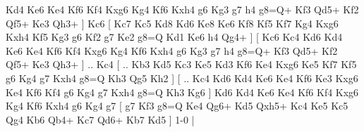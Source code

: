 Kd4  Ke6 Ke4  Kf6 Kf4  Kxg6 Kg4  Kf6 Kxh4  g6 Kg3  g7 h4  g8=Q+ Kf3  Qd5+ Kf2  Qf5+ Ke3  Qh3+   ]  Kc6 [  Kc7 Kc5  Kd8 Kd6  Ke8 Ke6  Kf8 Kf5  Kf7 Kg4  Kxg6 Kxh4  Kf5 Kg3  g6 Kf2  g7 Ke2  g8=Q Kd1  Ke6 h4  Qg4+   ]  [  Kc6 Kc4  Kd6 Kd4  Ke6 Ke4  Kf6 Kf4  Kxg6 Kg4  Kf6 Kxh4  g6 Kg3  g7 h4  g8=Q+ Kf3  Qd5+ Kf2  Qf5+ Ke3  Qh3+   ] .. Kc4 [ .. Kb3  Kd5 Kc3  Ke5 Kd3  Kf6 Ke4  Kxg6 Ke5  Kf7 Kf5  g6 Kg4  g7 Kxh4  g8=Q Kh3  Qg5 Kh2   ]  [ .. Kc4  Kd6 Kd4  Ke6 Ke4  Kf6 Ke3  Kxg6 Ke4  Kf6 Kf4  g6 Kg4  g7 Kxh4  g8=Q Kh3  Kg6   ]  Kd6   Kd4    Ke6   Ke4    Kf6   Kf4    Kxg6   Kg4    Kf6   Kxh4    g6   Kg4    g7    [  g7 Kf3  g8=Q Ke4  Qg6+ Kd5  Qxh5+ Kc4  Ke5 Kc5  Qg4 Kb6  Qb4+ Kc7  Qd6+ Kb7  Kd5   ] 1-0  |
